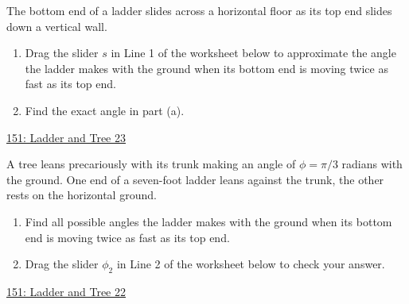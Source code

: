\documentclass{ximera}
\begin{document}
\begin{question}  \label{Qhfhghllllgg}
The bottom end of a ladder slides across a horizontal floor as its top end slides down a vertical wall.

\begin{enumerate}
\item Drag the slider $s$ in Line 1 of the worksheet below to approximate the angle the ladder makes with the ground when its bottom end is moving twice as fast as its top end.

\item Find the exact angle in part (a).
\end{enumerate}

 
\begin{onlineOnly}
   \begin{center}
\end{center}
\end{onlineOnly}

\href{https://www.desmos.com/calculator/mlulonqhoa}{151: Ladder and Tree 23}

\end{question}



\begin{question}  \label{Qsdafdsfhggg}
A tree leans precariously with its trunk making an angle of $\phi = \pi/3$ radians with the ground. One end of a seven-foot ladder leans against the trunk, the other rests on the horizontal ground.

\begin{enumerate}
\item Find all possible angles the ladder makes with the ground when its bottom end is moving twice as fast as its top end.

\item Drag the slider $\phi_2$ in Line 2 of the worksheet below to check your answer. 
\end{enumerate}

 
\begin{onlineOnly}
   \begin{center}
\end{center}
\end{onlineOnly}

\href{https://www.desmos.com/calculator/oftz4vb9qj}{151: Ladder and Tree 22}

\end{question}
\end{document}
